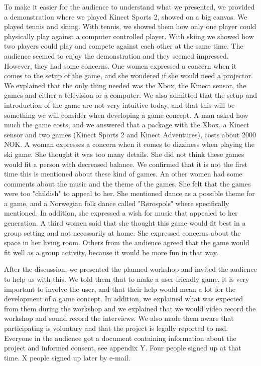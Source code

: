 To make it easier for the audience to understand what we presented, we provided a demonstration where we played Kinect Sports 2, showed on a big canvas. We played tennis and skiing. With tennis, we showed them how only one player could physically play against a computer controlled player. With skiing we showed how two players could play and compete against each other at the same time. The audience seemed to enjoy the demonstration and they seemed impressed. However, they had some concerns. One women expressed a concern when it comes to the setup of the game, and she wondered if she would need a projector. We explained that the only thing needed was the Xbox, the Kinect sensor, the games and either a television or a computer. We also admitted that the setup and introduction of the game are not very intuitive today, and that this will be something we will consider when developing a game concept. A man asked how much the game costs, and we answered that a package with the Xbox, a Kinect sensor and two games (Kinect Sports 2 and Kinect Adventures), costs about 2000 NOK. A woman expresses a concern when it comes to dizziness when playing the ski game. She thought it was too many details. She did not think these games would fit a person with decreased balance. We confirmed that it is not the first time this is mentioned about these kind of games. An other women had some comments about the music and the theme of the games. She felt that the games were too "childish" to appeal to her. She mentioned dance as a possible theme for a game, and a Norwegian folk dance called "Rørospols" where specifically mentioned. In addition, she expressed a wish for music that appealed to her generation. A third women said that she thought this game would fit best in a group setting and not necessarily at home. She expressed concerns about the space in her living room. Others from the audience agreed that the game would fit well as a group activity, because it would be more fun in that way.

After the discussion, we presented the planned workshop and invited the audience to help us with this. We told them that to make a user-friendly game, it is very important to involve the user, and that their help would mean a lot for the development of a game concept. In addition, we explained what was expected from them during the workshop and we explained that we would video record the workshop and sound record the interviews. We also made them aware that participating is voluntary and that the project is legally reported to \ac{nsd}. Everyone in the audience got a document containing information about the project and informed consent, see appendix Y. Four people signed up at that time. X people signed up later by e-mail.

